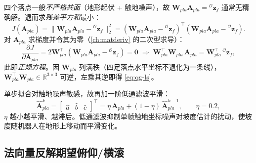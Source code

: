 \begin{derivation}\label{deriv:qg-ls}
四个落点一般\emph{不严格共面}（地形起伏 + 触地噪声），故 $\mathbf{W}_{pla}\mathbf{A}_{pla}={}^{\mathcal{O}}\boldsymbol{z}_f$ 通常无精确解。退而求\emph{残差平方和}最小：
\[
  J(\mathbf{A}_{pla})=\big\|\mathbf{W}_{pla}\mathbf{A}_{pla}-{}^{\mathcal{O}}\boldsymbol{z}_f\big\|_2^2
  =(\mathbf{W}_{pla}\mathbf{A}_{pla}-{}^{\mathcal{O}}\boldsymbol{z}_f)^\top(\mathbf{W}_{pla}\mathbf{A}_{pla}-{}^{\mathcal{O}}\boldsymbol{z}_f).
\]
对 $\mathbf{A}_{pla}$ 求梯度并令其为零（\cref{ch:matderiv} 的二次型求导）：
\[
  \frac{\partial J}{\partial\mathbf{A}_{pla}}=2\mathbf{W}_{pla}^\top(\mathbf{W}_{pla}\mathbf{A}_{pla}-{}^{\mathcal{O}}\boldsymbol{z}_f)=\mathbf{0}
  \;\Longrightarrow\;
  \mathbf{W}_{pla}^\top\mathbf{W}_{pla}\,\mathbf{A}_{pla}=\mathbf{W}_{pla}^\top\,{}^{\mathcal{O}}\boldsymbol{z}_f,
\]
此即\emph{正规方程}。因 $\mathbf{W}_{pla}$ 列满秩（四足落点水平坐标不退化为一条线），$\mathbf{W}_{pla}^\top\mathbf{W}_{pla}\in\mathbb{R}^{3\times3}$ 可逆，左乘其逆即得 \cref{eq:qg-ls}。
\end{derivation}

单步拟合对触地噪声敏感，故再加一阶低通滤波平滑\cite{yu2021quadruped}：
\begin{equation}
  \hat{\mathbf{A}}_{pla}^{k}=\begin{bmatrix}\hat a & \hat b & \hat c\end{bmatrix}^\top
  =\eta\,\mathbf{A}_{pla}+(1-\eta)\,\hat{\mathbf{A}}_{pla}^{k-1},
  \qquad \eta=0.2,
  \label{eq:qg-lpf}
\end{equation}
$\eta$ 越小越平滑、越滞后。低通滤波抑制单帧触地坐标噪声对坡度估计的扰动，使坡度随机器人在地形上移动而平滑变化。

\subsection{法向量反解期望俯仰/横滚}
\label{subsec:qg-normal}

